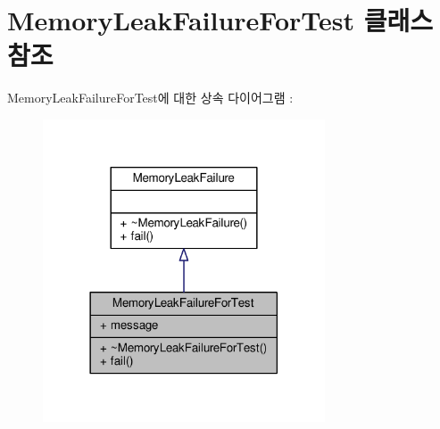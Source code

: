 \hypertarget{class_memory_leak_failure_for_test}{}\section{Memory\+Leak\+Failure\+For\+Test 클래스 참조}
\label{class_memory_leak_failure_for_test}


Memory\+Leak\+Failure\+For\+Test에 대한 상속 다이어그램 \+: 
\nopagebreak
\begin{figure}[H]
\begin{center}
\leavevmode
\includegraphics[width=237pt]{class_memory_leak_failure_for_test__inherit__graph}
\end{center}
\end{figure}


